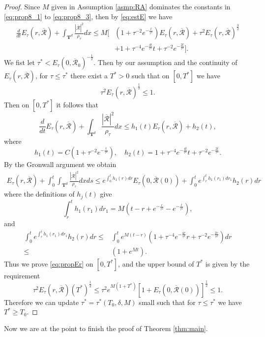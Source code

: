 \documentclass[english]{amsart}
\theoremstyle{plain}
\theoremstyle{definition}
\theoremstyle{remark}
\theoremstyle{plain}
\theoremstyle{plain}
\theoremstyle{plain}
\def\T{{\mathbf T}}%
\numberwithin{equation}{section}
\begin{document}
\begin{proof}
Since $M$ given in Assumption \ref{asmp:RA} dominates the constants in \eqref{eq:prop8_1} to \eqref{eq:prop8_3}, then by \eqref{eq:estE} we have
\begin{align*}
\frac{d}{dt}E_\tau(r,\overline{\mathcal{R}})+\int_{{\T^d}} \frac{|\overline{\mathcal{R}}|^2}{\rho_\tau}dx\leq M[&(1+\tau^{-2}e^{-\frac{t}{\tau^2}})E_\tau(r,\overline{\mathcal{R}})+\tau^2E_\tau(r,\overline{\mathcal{R}})^\frac32\\
&+1+\tau^{-4}e^{-\frac{4t}{\tau^2}}t+\tau^{-2}e^{-\frac{2t}{\tau^2}}].
\end{align*}
We fist let $\tau^*<E_\tau(0,\overline{\mathcal{R}}_0)^{-\frac12}$. Then by our assumption and the continuity of $E_\tau(r,\overline{\mathcal{R}})$, for $\tau\leq \tau^*$ there exist a $T^*>0$ such that on $[0,T^*]$ we have
\[
\tau^2E_\tau(r,\overline{\mathcal{R}})^\frac12\leq 1.
\]
Then on $[0,T^*]$ it follows that
\[
\frac{d}{dt}E_\tau(r,\overline{\mathcal{R}})+\int_{{\T^d}} \frac{|\overline{\mathcal{R}}|^2}{\rho_\tau}dx\leq h_1(t)E_\tau(r,\overline{\mathcal{R}})+h_2(t),
\]
where
\[
h_1(t)=C(1+\tau^{-2}e^{-\frac{t}{\tau^2}}),\quad h_2(t)=1+\tau^{-4}e^{-\frac{4t}{\tau^2}}t+\tau^{-2}e^{-\frac{2t}{\tau^2}}.
\]
By the Gronwall argument we obtain
\begin{align*}
E_\tau(r,\overline{\mathcal{R}})+\int_0^t\int_{{\T^d}} \frac{|\overline{\mathcal{R}}|^2}{\rho_\tau}dxds\leq e^{\int_0^t h_1(r)dr}E_\tau(0,\overline{\mathcal{R}}(0))+\int_0^t e^{\int_r^t h_1(r_1)dr_1}h_2(r)dr
\end{align*}
where the definitions of $h_j(t)$ give
\[
\int_r^t h_1(r_1)dr_1=M\left(t-r+e^{-\frac{r}{\tau^2}}-e^{-\frac{t}{\tau^2}}\right),
\]
and
\begin{align*}
\int_0^t e^{\int_r^t h_1(r_1)dr_1}h_2(r)dr\leq & \int_0^t e^{M(t-r)}\left(1+\tau^{-4}e^{-\frac{4r}{\tau^2}}r+\tau^{-2}e^{-\frac{2r}{\tau^2}}\right)dr\\
\leq & (1+e^{Mt}).
\end{align*}
Thus we prove \eqref{eq:propEr} on $[0,T^*]$, and the upper bound of $T^*$ is given by the requirement
\[
\tau^2E_\tau(r,\overline{\mathcal{R}})(T^*)^\frac12\leq \tau^2e^{M(1+T^*)}\left[1+E_\tau(0,\overline{\mathcal{R}}(0))\right]^\frac12\leq 1.
\]
Therefore we can update $\tau^*=\tau^*(T_0,\delta,M)$ small such that for $\tau\leq \tau^*$ we have $T^*\geq T_0$.
\end{proof}

Now we are at the point to finish the proof of Theorem \ref{thm:main}.
\end{document}
